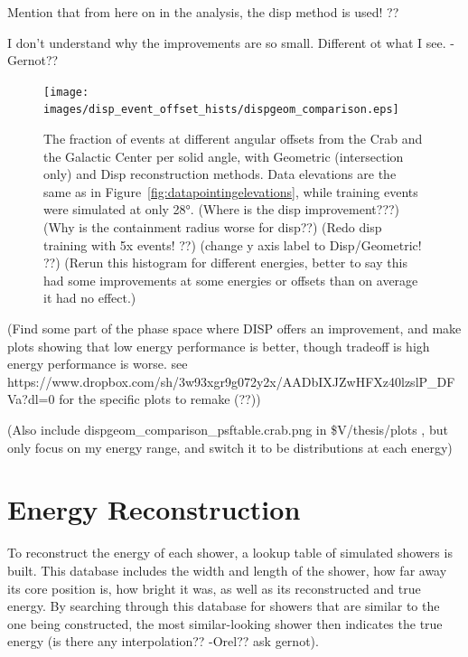     {\color{red} Mention that from here on in the analysis, the disp method is used! ??}
  
    {\color{red}I don't understand why the improvements are so small.  Different ot what I see. -Gernot?? }

    \begin{figure}[ht]
      \centering
      \texttt{[image: images/disp\_event\_offset\_hists/dispgeom\_comparison.eps]}
      \caption[DISP Offset Improvement]{
        The fraction of events at different angular offsets from the Crab and the Galactic Center per solid angle, with Geometric (intersection only) and Disp reconstruction methods.
        Data elevations are the same as in Figure~\ref{fig:datapointingelevations}, while training events were simulated at only \ang{28}.
        {\color{red}(Where is the disp improvement???)}
        {\color{red}(Why is the containment radius worse for disp??)}
        {\color{red}(Redo disp training with 5x events! ??)}
        {\color{red}(change y axis label to Disp/Geometric! ??)}
        {\color{red}(Rerun this histogram for different energies, better to say this had some improvements at some energies or offsets than on average it had no effect.)}
      }
      \label{fig:disp_event_offset}
    \end{figure}
  
  {\color{red}(Find some part of the phase space where DISP offers an improvement, and make plots showing that low energy performance is better, though tradeoff is high energy performance is worse. see https://www.dropbox.com/sh/3w93xgr9g072y2x/AADbIXJZwHFXz40lzslP\_DFVa?dl=0 for the specific plots to remake (??))}
  
  {\color{red}(Also include dispgeom\_comparison\_psftable.crab.png in \$V/thesis/plots , but only focus on my energy range, and switch it to be distributions at each energy)}

  
  \FloatBarrier

\section{Energy Reconstruction}\label{subsec:enrecon}
  To reconstruct the energy of each shower, a lookup table of simulated showers is built.
This database includes the width and length of the shower, how far away its core position is, how bright it was, as well as its reconstructed and true energy.
  By searching through this database for showers that are similar to the one being constructed, the most similar-looking shower then indicates the true energy {\color{red} (is there any interpolation?? -Orel?? ask gernot)}.


